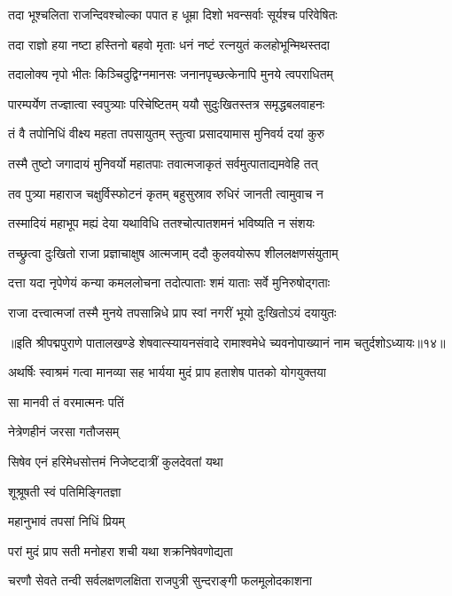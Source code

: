 \twolineshloka
{तदा भूश्चलिता राजन्दिवश्चोल्का पपात ह}
{धूम्रा दिशो भवन्सर्वाः सूर्यश्च परिवेषितः}%

\twolineshloka
{तदा राज्ञो हया नष्टा हस्तिनो बहवो मृताः}
{धनं नष्टं रत्नयुतं कलहोभून्मिथस्तदा}%

\twolineshloka
{तदालोक्य नृपो भीतः किञ्चिदुद्विग्नमानसः}
{जनानपृच्छत्केनापि मुनये त्वपराधितम्}%

\twolineshloka
{पारम्पर्येण तज्ज्ञात्वा स्वपुत्र्याः परिचेष्टितम्}
{ययौ सुदुःखितस्तत्र समृद्धबलवाहनः}%

\twolineshloka
{तं वै तपोनिधिं वीक्ष्य महता तपसायुतम्}
{स्तुत्वा प्रसादयामास मुनिवर्य दयां कुरु}%

\twolineshloka
{तस्मै तुष्टो जगादायं मुनिवर्यो महातपाः}
{तवात्मजाकृतं सर्वमुत्पाताद्यमवेहि तत्}%

\twolineshloka
{तव पुत्र्या महाराज चक्षुर्विस्फोटनं कृतम्}
{बहुसुस्राव रुधिरं जानती त्वामुवाच न}%

\twolineshloka
{तस्मादियं महाभूप मह्यं देया यथाविधि}
{ततश्चोत्पातशमनं भविष्यति न संशयः}%

\twolineshloka
{तच्छ्रुत्वा दुःखितो राजा प्रज्ञाचाक्षुष आत्मजाम्}
{ददौ कुलवयोरूप शीललक्षणसंयुताम्}%

\twolineshloka
{दत्ता यदा नृपेणेयं कन्या कमललोचना}
{तदोत्पाताः शमं याताः सर्वे मुनिरुषोद्गताः}%

\twolineshloka
{राजा दत्त्वात्मजां तस्मै मुनये तपसान्निधे}
{प्राप स्वां नगरीं भूयो दुःखितोऽयं दयायुतः}%

॥इति श्रीपद्मपुराणे पातालखण्डे शेषवात्स्यायनसंवादे रामाश्वमेधे च्यवनोपाख्यानं नाम चतुर्दशोऽध्यायः॥१४॥



\twolineshloka
{अथर्षिः स्वाश्रमं गत्वा मानव्या सह भार्यया}
{मुदं प्राप हताशेष पातको योगयुक्तया}%

सा मानवी तं वरमात्मनः पतिं

नेत्रेणहीनं जरसा गतौजसम्

\twolineshloka
{सिषेव एनं हरिमेधसोत्तमं}
{निजेष्टदात्रीं कुलदेवतां यथा}%

शूश्रूषती स्वं पतिमिङ्गितज्ञा

महानुभावं तपसां निधिं प्रियम्

\twolineshloka
{परां मुदं प्राप सती मनोहरा}
{शची यथा शक्रनिषेवणोद्यता}%

\twolineshloka
{चरणौ सेवते तन्वी सर्वलक्षणलक्षिता}
{राजपुत्री सुन्दराङ्गी फलमूलोदकाशना}%


